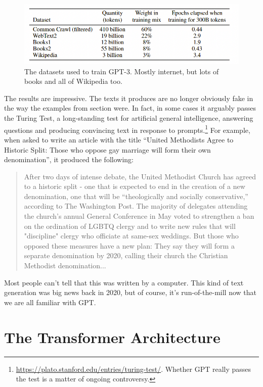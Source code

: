 \begin{figure}[h]
\centering
\includegraphics[scale=.4]{./images/gptDatasets}
\caption[GPT Technical report. Todo]{The datasets used to train GPT-3. Mostly internet, but lots of books and all of Wikipedia too. }
\label{gptDatasets}
\end{figure}

The results are impressive. The texts it produces are no longer obviously fake in the way the examples from section  were. In fact, in some cases it arguably passes the Turing Test, a long-standing test for artificial general intelligence, answering questions and producing convincing  text in response to prompts.\footnote{\url{https://plato.stanford.edu/entries/turing-test/}. Whether GPT really passes the test is a matter of ongoing controversy.} For example, when asked to write an article with the title ``United Methodists Agree to Historic Split: Those who oppose gay marriage will form their own denomination'', it produced the following:
\begin{quote}
After two days of intense debate, the United Methodist Church has agreed to a historic split - one that is expected to end in the creation of a new denomination, one that will be ``theologically and socially conservative,'' according to The Washington Post. The majority of delegates attending the church's annual General Conference in May voted to strengthen a ban on the ordination of LGBTQ clergy and to write new rules that will "discipline" clergy who officiate at same-sex weddings. But those who opposed these measures have a new plan: They say they will form a separate denomination by 2020, calling their church the Christian Methodist denomination...
\end{quote}
Most people can't tell that this was written by a computer.  This kind of text generation was big news back in 2020, but of course, it's run-of-the-mill now that we are all familiar with GPT.

\section{The Transformer Architecture}\label{transformers}

